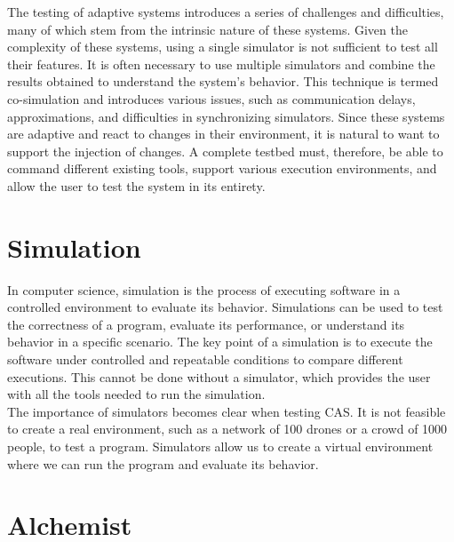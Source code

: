 \documentclass[12pt,a4paper,openright,twoside]{book}
\begin{document}
The testing of adaptive systems introduces a series of challenges and difficulties, many of which stem from the intrinsic nature of these systems.
Given the complexity of these systems, using a single simulator is not sufficient to test all their features.
It is often necessary to use multiple simulators and combine the results obtained to understand the system's behavior.
This technique is termed co-simulation and introduces various issues, such as communication delays, approximations, and difficulties in synchronizing simulators. \cite{DBLP:journals/simpra/ThuleLGML19}
Since these systems are adaptive and react to changes in their environment, it is natural to want to support the injection of changes. \cite{DBLP:conf/icac/BrownHHLLSY04}
A complete testbed must, therefore, be able to command different existing tools, support various execution environments, and allow the user to test the system in its entirety.

\section{Simulation}

In computer science, simulation is the process of executing software in a controlled environment to evaluate its behavior.
Simulations can be used to test the correctness of a program, evaluate its performance, or understand its behavior in a specific scenario.
The key point of a simulation is to execute the software under controlled and repeatable conditions to compare different executions. \cite{DBLP:journals/cacm/CollbergP16}
This cannot be done without a simulator, which provides the user with all the tools needed to run the simulation. \cite{argun2021simulation, bagrodia1998parsec} \\
The importance of simulators becomes clear when testing \ac{CAS}.
It is not feasible to create a real environment, such as a network of 100 drones or a crowd of 1000 people, to test a program.
Simulators allow us to create a virtual environment where we can run the program and evaluate its behavior. \\

\section{Alchemist}
\end{document}
